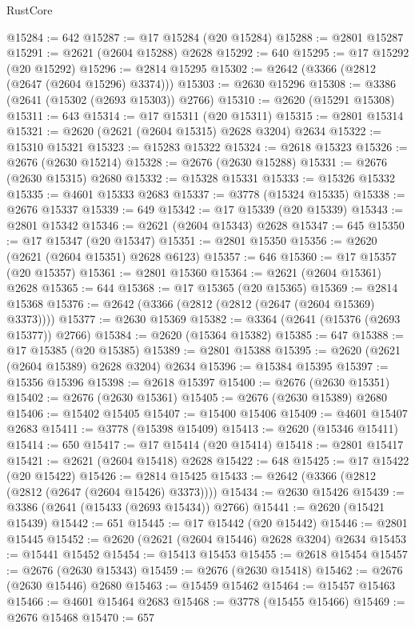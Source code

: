 \begin{lexlean}{RustCore}
\begin{coremodule}
@15284 := 642
@15287 := @17 @15284 (@20 @15284)
@15288 := @2801 @15287
@15291 := @2621 (@2604 @15288) @2628
@15292 := 640
@15295 := @17 @15292 (@20 @15292)
@15296 := @2814 @15295
@15302 := @2642 (@3366 (@2812 (@2647 (@2604 @15296) @3374)))
@15303 := @2630 @15296
@15308 := @3386 (@2641 (@15302 (@2693 @15303)) @2766)
@15310 := @2620 (@15291 @15308)
@15311 := 643
@15314 := @17 @15311 (@20 @15311)
@15315 := @2801 @15314
@15321 := @2620 (@2621 (@2604 @15315) @2628 @3204) @2634
@15322 := @15310 @15321
@15323 := @15283 @15322
@15324 := @2618 @15323
@15326 := @2676 (@2630 @15214)
@15328 := @2676 (@2630 @15288)
@15331 := @2676 (@2630 @15315) @2680
@15332 := @15328 @15331
@15333 := @15326 @15332
@15335 := @4601 @15333 @2683
@15337 := @3778 (@15324 @15335)
@15338 := @2676 @15337
@15339 := 649
@15342 := @17 @15339 (@20 @15339)
@15343 := @2801 @15342
@15346 := @2621 (@2604 @15343) @2628
@15347 := 645
@15350 := @17 @15347 (@20 @15347)
@15351 := @2801 @15350
@15356 := @2620 (@2621 (@2604 @15351) @2628 @6123)
@15357 := 646
@15360 := @17 @15357 (@20 @15357)
@15361 := @2801 @15360
@15364 := @2621 (@2604 @15361) @2628
@15365 := 644
@15368 := @17 @15365 (@20 @15365)
@15369 := @2814 @15368
@15376 := @2642 (@3366 (@2812 (@2812 (@2647 (@2604 @15369) @3373))))
@15377 := @2630 @15369
@15382 := @3364 (@2641 (@15376 (@2693 @15377)) @2766)
@15384 := @2620 (@15364 @15382)
@15385 := 647
@15388 := @17 @15385 (@20 @15385)
@15389 := @2801 @15388
@15395 := @2620 (@2621 (@2604 @15389) @2628 @3204) @2634
@15396 := @15384 @15395
@15397 := @15356 @15396
@15398 := @2618 @15397
@15400 := @2676 (@2630 @15351)
@15402 := @2676 (@2630 @15361)
@15405 := @2676 (@2630 @15389) @2680
@15406 := @15402 @15405
@15407 := @15400 @15406
@15409 := @4601 @15407 @2683
@15411 := @3778 (@15398 @15409)
@15413 := @2620 (@15346 @15411)
@15414 := 650
@15417 := @17 @15414 (@20 @15414)
@15418 := @2801 @15417
@15421 := @2621 (@2604 @15418) @2628
@15422 := 648
@15425 := @17 @15422 (@20 @15422)
@15426 := @2814 @15425
@15433 := @2642 (@3366 (@2812 (@2812 (@2647 (@2604 @15426) @3373))))
@15434 := @2630 @15426
@15439 := @3386 (@2641 (@15433 (@2693 @15434)) @2766)
@15441 := @2620 (@15421 @15439)
@15442 := 651
@15445 := @17 @15442 (@20 @15442)
@15446 := @2801 @15445
@15452 := @2620 (@2621 (@2604 @15446) @2628 @3204) @2634
@15453 := @15441 @15452
@15454 := @15413 @15453
@15455 := @2618 @15454
@15457 := @2676 (@2630 @15343)
@15459 := @2676 (@2630 @15418)
@15462 := @2676 (@2630 @15446) @2680
@15463 := @15459 @15462
@15464 := @15457 @15463
@15466 := @4601 @15464 @2683
@15468 := @3778 (@15455 @15466)
@15469 := @2676 @15468
@15470 := 657

\end{coremodule}
\end{lexlean}
